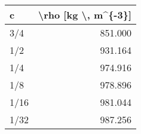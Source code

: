 \begin{tabular}{lr}
\toprule
   c &  \textbackslash rho [kg \textbackslash , m\textasciicircum \{-3\}] \\
\midrule
 3/4 &              851.000 \\
 1/2 &              931.164 \\
 1/4 &              974.916 \\
 1/8 &              978.896 \\
1/16 &              981.044 \\
1/32 &              987.256 \\
\bottomrule
\end{tabular}
